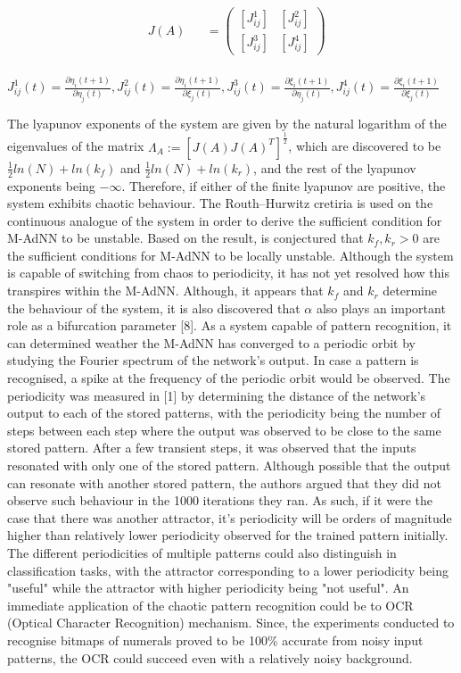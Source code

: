 \documentclass[12pt, letterpaper]{article}
\begin{document}
$$
\begin{aligned}
& J(A) &&= \begin{pmatrix}
  [J_{ij}^1] & [J_{ij}^2]\\
  [J_{ij}^3] & [J_{ij}^4]
  \end{pmatrix}\\
\end{aligned}
$$

$J_{ij}^1(t) = \frac{\partial \eta_i(t+1)}{\partial \eta_j(t)}, J_{ij}^2(t) = \frac{\partial \eta_i(t+1)}{\partial \xi_j(t)}, J_{ij}^3(t) = \frac{\partial \xi_i(t+1)}{\partial \eta_j(t)}, J_{ij}^4(t) = \frac{\partial \xi_i(t+1)}{\partial \xi_j(t)}$

The lyapunov exponents of the system are given by the natural logarithm of the eigenvalues of the matrix $\Lambda_A := [J(A)J(A)^T]^{\frac{1}{2}}$, which are discovered to be ${\frac{1}{2}}ln(N) + ln(k_f)$ and ${\frac{1}{2}}ln(N) + ln(k_r)$, and the rest of the lyapunov exponents being $-\infty$. Therefore, if either of the finite lyapunov are positive, the system exhibits chaotic behaviour. The Routh–Hurwitz cretiria is used on the continuous analogue of the system in order to derive the sufficient condition for M-AdNN to be unstable. Based on the result, is conjectured that $k_f, k_r > 0$ are the sufficient conditions for M-AdNN to be locally unstable. Although the system is capable of switching from chaos to periodicity, it has not yet resolved how this transpires within the M-AdNN. Although, it appears that $k_f$ and $k_r$ determine the behaviour of the system, it is also discovered that $\alpha$ also plays an important role as a bifurcation parameter [8]. As a system capable of pattern recognition, it can determined weather the M-AdNN has converged to a periodic orbit by studying the Fourier spectrum of the network's output. In case a pattern is recognised, a spike at the frequency of the periodic orbit would be observed. The periodicity was measured in [1] by determining the distance of the network's output to each of the stored patterns, with the periodicity being the number of steps between each step where the output was observed to be close to the same stored pattern. After a few transient steps, it was observed that the inputs resonated with only one of the stored pattern. Although possible that the output can resonate with another stored pattern, the authors argued that they did not observe such behaviour in the 1000 iterations they ran. As such, if it were the case that there was another attractor, it's periodicity will be orders of magnitude higher than relatively lower periodicity observed for the trained pattern initially. The different periodicities of multiple patterns could also distinguish in classification tasks, with the attractor corresponding to a lower periodicity being "useful" while the attractor with higher periodicity being "not useful". An immediate application of the chaotic pattern recognition could be to OCR (Optical Character Recognition) mechanism. Since, the experiments conducted to recognise bitmaps of numerals proved to be 100\% accurate from noisy input patterns, the OCR could succeed even with a relatively noisy background.
\end{document}
